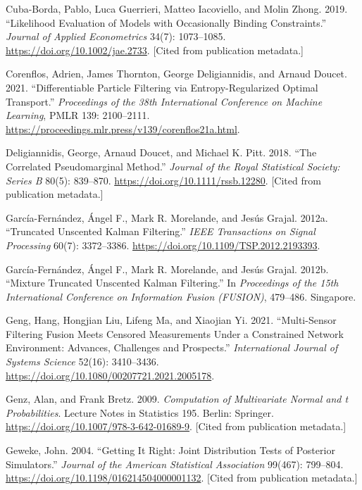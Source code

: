 \documentclass[11pt]{article}
\begin{document}
\begin{list}{}{\setlength{\leftmargin}{2em}\setlength{\itemindent}{-2em}\setlength{\itemsep}{2pt}\setlength{\parsep}{0pt}}
\item Cuba-Borda, Pablo, Luca Guerrieri, Matteo Iacoviello, and Molin Zhong. 2019. ``Likelihood Evaluation of Models with Occasionally Binding Constraints.'' \emph{Journal of Applied Econometrics} 34(7): 1073--1085. \url{https://doi.org/10.1002/jae.2733}. [Cited from publication metadata.]

\item Corenflos, Adrien, James Thornton, George Deligiannidis, and Arnaud Doucet. 2021. ``Differentiable Particle Filtering via Entropy-Regularized Optimal Transport.'' \emph{Proceedings of the 38th International Conference on Machine Learning}, PMLR 139: 2100--2111. \url{https://proceedings.mlr.press/v139/corenflos21a.html}.

\item Deligiannidis, George, Arnaud Doucet, and Michael K. Pitt. 2018. ``The Correlated Pseudomarginal Method.'' \emph{Journal of the Royal Statistical Society: Series B} 80(5): 839--870. \url{https://doi.org/10.1111/rssb.12280}. [Cited from publication metadata.]

\item Garc\'ia-Fern\'andez, \'Angel F., Mark R. Morelande, and Jes\'us Grajal. 2012a. ``Truncated Unscented Kalman Filtering.'' \emph{IEEE Transactions on Signal Processing} 60(7): 3372--3386. \url{https://doi.org/10.1109/TSP.2012.2193393}.

\item Garc\'ia-Fern\'andez, \'Angel F., Mark R. Morelande, and Jes\'us Grajal. 2012b. ``Mixture Truncated Unscented Kalman Filtering.'' In \emph{Proceedings of the 15th International Conference on Information Fusion (FUSION)}, 479--486. Singapore.

\item Geng, Hang, Hongjian Liu, Lifeng Ma, and Xiaojian Yi. 2021. ``Multi-Sensor Filtering Fusion Meets Censored Measurements Under a Constrained Network Environment: Advances, Challenges and Prospects.'' \emph{International Journal of Systems Science} 52(16): 3410--3436. \url{https://doi.org/10.1080/00207721.2021.2005178}.

\item Genz, Alan, and Frank Bretz. 2009. \emph{Computation of Multivariate Normal and t Probabilities}. Lecture Notes in Statistics 195. Berlin: Springer. \url{https://doi.org/10.1007/978-3-642-01689-9}. [Cited from publication metadata.]

\item Geweke, John. 2004. ``Getting It Right: Joint Distribution Tests of Posterior Simulators.'' \emph{Journal of the American Statistical Association} 99(467): 799--804. \url{https://doi.org/10.1198/016214504000001132}. [Cited from publication metadata.]


\end{list}
\end{document}
